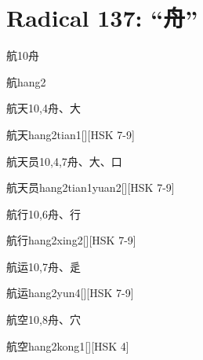
\section*{Radical 137: ``⾈''}

\begin{Entry}{航}{10}{⾈}
  \begin{Phonetics}{航}{hang2}
  \end{Phonetics}
\end{Entry}

\begin{Entry}{航天}{10,4}{⾈、⼤}
  \begin{Phonetics}{航天}{hang2tian1}[][HSK 7-9]
  \end{Phonetics}
\end{Entry}

\begin{Entry}{航天员}{10,4,7}{⾈、⼤、⼝}
  \begin{Phonetics}{航天员}{hang2tian1yuan2}[][HSK 7-9]
  \end{Phonetics}
\end{Entry}

\begin{Entry}{航行}{10,6}{⾈、⾏}
  \begin{Phonetics}{航行}{hang2xing2}[][HSK 7-9]
  \end{Phonetics}
\end{Entry}

\begin{Entry}{航运}{10,7}{⾈、⾡}
  \begin{Phonetics}{航运}{hang2yun4}[][HSK 7-9]
  \end{Phonetics}
\end{Entry}

\begin{Entry}{航空}{10,8}{⾈、⽳}
  \begin{Phonetics}{航空}{hang2kong1}[][HSK 4]
  \end{Phonetics}
\end{Entry}

